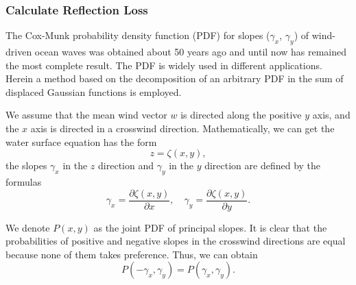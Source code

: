 \documentclass{mcmthesis}
\begin{document}
\subsubsection{Calculate Reflection Loss}
The Cox-Munk probability density function (PDF) for slopes ($\gamma_x$, $\gamma_y$) of wind-driven ocean waves was obtained about 50 years ago and until now has remained the most complete result. The PDF is widely used in different applications. Herein a method based on the decomposition of an arbitrary PDF in the sum of displaced Gaussian functions is employed. 

We assume that the mean wind vector $w$ is directed along the positive $y$ axis, and the $x$ axis is directed in a crosswind direction. Mathematically, we can get the water surface equation has the form 
\begin{equation}
z = \zeta (x,y),
\end{equation}
the slopes $\gamma_x$ in the $z$ direction and $\gamma_y$ in the $y$ direction are defined by the formulas
\begin{equation}
\gamma_x = \frac{\partial \zeta(x,y)}{\partial x}, \quad
\gamma_y = \frac{\partial\zeta (x,y)}{\partial y}.
\end{equation}

We denote $P(x,y)$ as the joint PDF of principal slopes. It is clear that the probabilities of positive and negative slopes in the crosswind directions are equal because none of them takes preference. Thus, we can obtain
\begin{equation}
P(-\gamma_x, \gamma_y) = P(\gamma_x, \gamma_y).
\end{equation}
\end{document}
